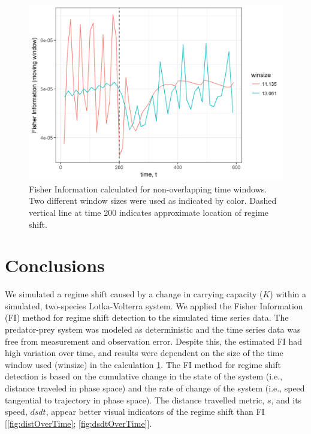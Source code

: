 \documentclass[12pt,twoside,openany]{reedthesis}
\begin{document}
\begin{figure}
\includegraphics[width=0.85\linewidth]{./chapterFiles/fiGuide/figures/fiOverTime} \caption{Fisher Information calculated for non-overlapping time windows. Two different window sizes were used as indicated by color. Dashed vertical line at time 200 indicates approximate location of regime shift.}\label{fig:fiOverTime}
\end{figure}
\hypertarget{conclusions}{%
\section{Conclusions}\label{conclusions}}

We simulated a regime shift caused by a change in carrying capacity (\(K\)) within a simulated, two-species Lotka-Volterra system. We applied the Fisher Information (FI) method for regime shift detection to the simulated time series data. The predator-prey system was modeled as deterministic and the time series data was free from measurement and observation error. Despite this, the estimated FI had high variation over time, and results were dependent on the size of the time window used (winsize) in the calculation \ref{fig:fiOverTime}. The FI method for regime shift detection is based on the cumulative change in the state of the system (i.e., distance traveled in phase space) and the rate of change of the system (i.e., speed tangential to trajectory in phase space). The distance travelled metric, \(s\), and its speed, \(dsdt\), appear better visual indicators of the regime shift than FI {[}\ref{fig:distOverTime}; \ref{fig:dsdtOverTime}{]}.
\end{document}
